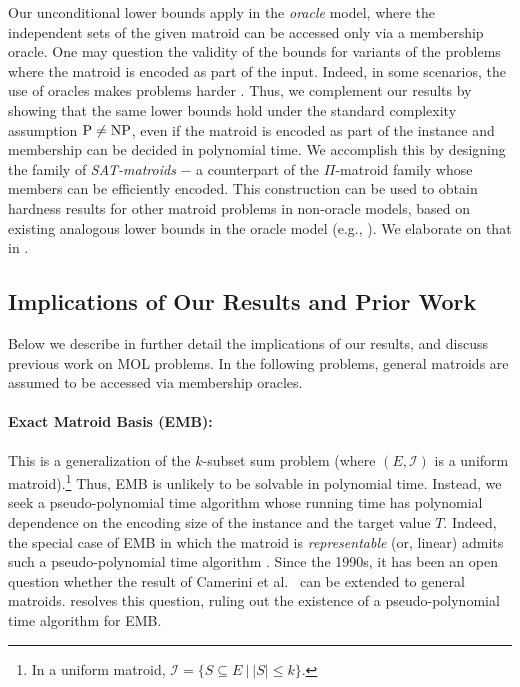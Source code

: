 \documentclass[11pt,letter]{article}
\newcommand{\cI}{{\mathcal{I}}}
\begin{document}
	
		 Our unconditional lower bounds apply in the {\em oracle} model, where the independent sets of the given matroid can be accessed only via a membership oracle. One may question the validity of the bounds for variants of the problems where the matroid is encoded as part of the input. Indeed, in some scenarios, the use of oracles makes problems harder \cite{canetti2004random,chang1994random}. Thus, we complement our results by showing that the same lower bounds hold under the standard complexity assumption $\textnormal{P}\neq\textnormal{NP}$, even if the matroid is encoded as part of the instance and membership can be decided in polynomial time. We accomplish this by designing the family of {\em \textnormal{SAT}-matroids} $-$ a counterpart of the $\Pi$-matroid family whose members can be efficiently encoded. This construction can be used to obtain hardness results for other matroid problems in non-oracle models, based on existing analogous lower bounds in the oracle model (e.g., \cite{JK82}). We elaborate on that in .
	
	


		\subsection{Implications of Our Results and Prior Work}
\label{sec:results}		

Below we describe in further detail the implications of our results, and discuss previous work on MOL problems. In the following problems, general matroids are assumed to be accessed via membership oracles. 

\paragraph{Exact Matroid Basis (EMB):}
This is a generalization of the $k$-{\sc subset sum} problem (where $(E,\cI)$ is a uniform matroid).\footnote{In a uniform matroid, $\cI= \{S \subseteq E~|~ |S| \leq k\}$.} Thus, EMB is unlikely to be solvable in polynomial time. Instead, we seek a pseudo-polynomial time algorithm whose running time has polynomial dependence on the encoding size of the instance and the target value $T$. 
Indeed, the special case of EMB in which the matroid is {\em representable} (or, linear) admits such  a pseudo-polynomial time algorithm \cite{CGM92}. Since the 1990s, it has been an open question whether the result of Camerini et al.~\cite{CGM92} can be extended to general matroids. 
 resolves this question, ruling out the existence of  a pseudo-polynomial time algorithm for EMB.
\end{document}
